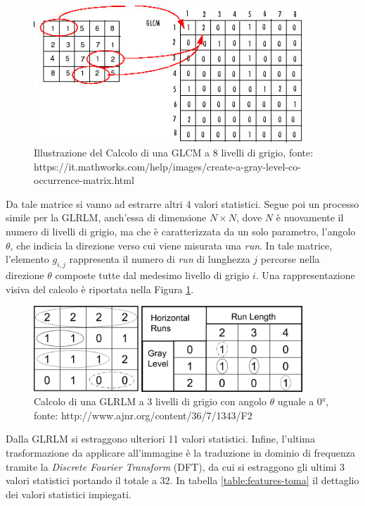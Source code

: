 \begin{figure}[h]
    \center
    \includegraphics[width=0.9\textwidth]{./assets/glcm.jpg}
    \caption{Illustrazione del Calcolo di una GLCM a 8 livelli di grigio, fonte: https://it.mathworks.com/help/images/create-a-gray-level-co-occurrence-matrix.html}
\end{figure}

Da tale matrice si vanno ad estrarre altri 4 valori statistici.
Segue poi un processo simile per la GLRLM, anch'essa di dimensione
$N \times N$, dove $N$ è nuovamente il numero di livelli di grigio,
ma che è caratterizzata da un solo parametro, l'angolo $\theta$,
che indicia la direzione verso cui viene misurata una {\it run}.
In tale matrice, l'elemento $g_{i,j}$ rappresenta il numero di {\it run}
di lunghezza $j$ percorse nella direzione $\theta$ composte tutte dal medesimo
livello di grigio $i$.
Una rappresentazione visiva del calcolo è riportata nella Figura \ref{fig:glrlm}.

\begin{figure}[h]
    \center
    \includegraphics[width=0.9\textwidth]{./assets/glrlm.jpg}
    \caption{\label{fig:glrlm}Calcolo di una GLRLM a 3 livelli di grigio con angolo $\theta$ uguale a 0°, fonte: http://www.ajnr.org/content/36/7/1343/F2}
\end{figure}

Dalla GLRLM si estraggono ulteriori 11 valori statistici.
Infine, l'ultima trasformazione da applicare all'immagine è la traduzione in
dominio di frequenza tramite la {\it Discrete Fourier Transform} (DFT), da cui
si estraggono gli ultimi 3 valori statistici portando il totale a 32.
In tabella \ref{table:features-toma} il dettaglio dei valori statistici impiegati.

